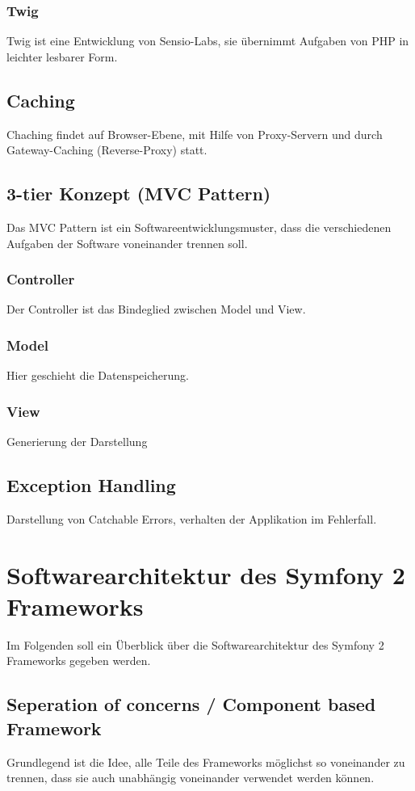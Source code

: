 \documentclass[12pt]{report}
\begin{document}
\subsection{Twig}
Twig ist eine Entwicklung von Sensio-Labs, sie übernimmt Aufgaben von PHP in leichter lesbarer Form.

\section{Caching}
Chaching findet auf Browser-Ebene, mit Hilfe von Proxy-Servern und durch Gateway-Caching (Reverse-Proxy) statt.

\section{3-tier Konzept (MVC Pattern)}
Das MVC Pattern ist ein Softwareentwicklungsmuster, dass die verschiedenen Aufgaben der Software voneinander trennen soll.
\subsection{Controller}
Der Controller ist das Bindeglied zwischen Model und View.
\subsection{Model}
Hier geschieht die Datenspeicherung.
\subsection{View}
Generierung der Darstellung
\section{Exception Handling}
Darstellung von Catchable Errors, verhalten der Applikation im Fehlerfall.


\chapter{Softwarearchitektur des Symfony 2 Frameworks}
\label{sec:symfony}
Im Folgenden soll ein Überblick über die Softwarearchitektur des Symfony 2 Frameworks gegeben werden.
\section{Seperation of concerns / Component based Framework}
Grundlegend ist die Idee, alle Teile des Frameworks möglichst so voneinander zu trennen, dass sie auch unabhängig voneinander verwendet werden können.
\end{document}
